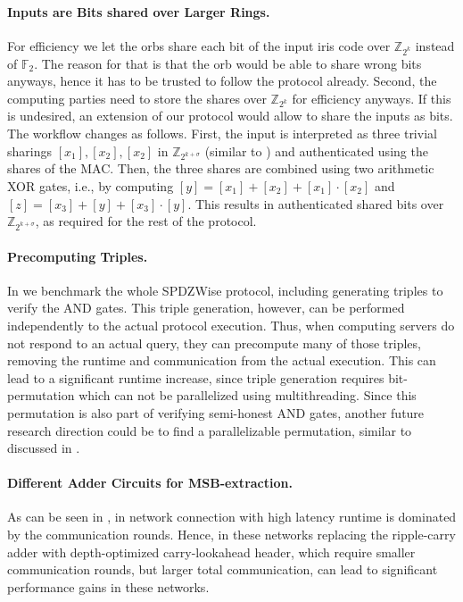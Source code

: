 \documentclass[a4paper,11pt,
]{article}
\newcommand{\F}{\ensuremath{\mathbb{F}}\xspace}
\newcommand{\Z}{\ensuremath{\mathbb{Z}}\xspace}
\newcommand{\shared}[1]{\ensuremath{[{#1}]}}
\begin{document}
\paragraph{Inputs are Bits shared over Larger Rings.}
For efficiency we let the orbs share each bit of the input iris code over $\Z_{2^k}$ instead of $\F_2$. The reason for that is that the orb would be able to share wrong bits anyways, hence it has to be trusted to follow the protocol already. Second, the computing parties need to store the shares over $\Z_{2^k}$ for efficiency anyways.
If this is undesired, an extension of our protocol would allow to share the inputs as bits. The workflow changes as follows. First, the input is interpreted as three trivial sharings $\shared{x_1}, \shared{x_2}, \shared{x_2}$ in $\Z_{2^{k + \sigma}}$ (similar to ) and authenticated using the shares of the MAC. Then, the three shares are combined using two arithmetic XOR gates, i.e., by computing $\shared{y} = \shared{x_1}+ \shared{x_2} + \shared{x_1} \cdot \shared{x_2}$ and $\shared{z} = \shared{x_3} + \shared{y} + \shared{x_3} \cdot \shared{y}$. This results in authenticated shared bits over $\Z_{2^{k + \sigma}}$, as required for the rest of the protocol.

\paragraph{Precomputing Triples.}
In  we benchmark the whole SPDZWise protocol, including generating triples to verify the AND gates. This triple generation, however, can be performed independently to the actual protocol execution. Thus, when computing servers  do not respond to an actual query, they can precompute many of those triples, removing the runtime and communication from the actual execution. This can lead to a significant runtime increase, since triple generation requires bit-permutation which can not be parallelized using multithreading. Since this permutation is also part of verifying semi-honest AND gates, another future research direction could be to find a parallelizable permutation, similar to discussed in \cite{DBLP:conf/sp/ArakiBFLLNOWW17}.

\paragraph{Different Adder Circuits for MSB-extraction.}
As can be seen in , in network connection with high latency runtime is dominated by the communication rounds. Hence, in these networks replacing the ripple-carry adder with depth-optimized carry-lookahead header, which require smaller communication rounds, but larger total communication, can lead to significant performance gains in these networks.
\end{document}
